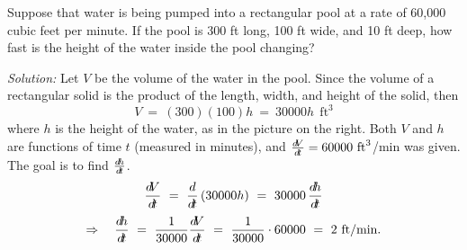 \begin{exmp}\label{exmp:relrate1}
\noindent Suppose that water is being pumped into a rectangular pool at a rate
of 60,000 cubic feet per minute. If the pool is 300 ft long, 100 ft wide, and
10 ft deep, how fast is the height of the water inside the pool changing?\vspace{1mm}
\par\noindent\emph{Solution:} Let $V$ be the volume of the water in the pool.
Since the volume of a rectangular solid is the product of the length, width, and
height of the solid, then
\[
V ~=~ (300)(100)h ~=~ 30000h ~~\text{ft}^3
\]
where $h$ is the height of the water, as in the picture on the right.
Both $V$ and $h$ are functions of time $t$ (measured in minutes), and
$\frac{d\negmedspace V}{d\!t} = 60000~\text{ft}^3$/min was given. The goal is to find
$\frac{d\!h}{d\!t}$.
\[
\frac{d\negmedspace V}{d\!t} ~=~ \frac{d}{d\!t}\,(30000h) ~=~ 30000\,\frac{d\!h}{d\!t}
\]
\[
\Rightarrow\quad \frac{d\!h}{d\!t} ~=~ \frac{1}{30000} \frac{d\negmedspace V}{d\!t} ~=~ \frac{1}{30000}\cdot 60000
~=~ 2~\text{ft/min} .
\]
\end{exmp}
